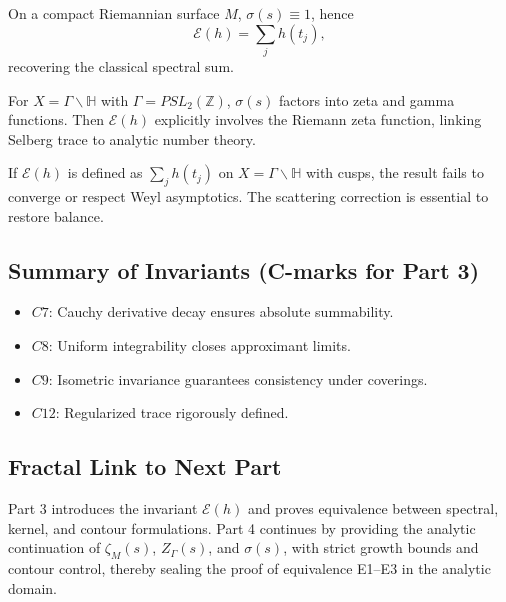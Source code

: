 \begin{example}
On a compact Riemannian surface $M$, $\sigma(s)\equiv 1$, hence
\[
\mathcal{E}(h) = \sum_j h(t_j),
\]
recovering the classical spectral sum.
\end{example}

\begin{example}
For $X=\Gamma\backslash\mathbb{H}$ with $\Gamma=PSL_2(\mathbb{Z})$, $\sigma(s)$ factors into zeta and gamma functions. Then $\mathcal{E}(h)$ explicitly involves the Riemann zeta function, linking Selberg trace to analytic number theory.
\end{example}

\begin{counterexample}
If $\mathcal{E}(h)$ is defined as $\sum_j h(t_j)$ on $X=\Gamma\backslash\mathbb{H}$ with cusps, the result fails to converge or respect Weyl asymptotics. The scattering correction is essential to restore balance.
\end{counterexample}

\subsection*{Summary of Invariants (C-marks for Part 3)}

\begin{itemize}
  \item $C7$: Cauchy derivative decay ensures absolute summability.
  \item $C8$: Uniform integrability closes approximant limits.
  \item $C9$: Isometric invariance guarantees consistency under coverings.
  \item $C12$: Regularized trace rigorously defined.
\end{itemize}

\subsection*{Fractal Link to Next Part}

Part 3 introduces the invariant $\mathcal{E}(h)$ and proves equivalence between spectral, kernel, and contour formulations.  
Part 4 continues by providing the analytic continuation of $\zeta_M(s)$, $Z_\Gamma(s)$, and $\sigma(s)$, with strict growth bounds and contour control, thereby sealing the proof of equivalence E1–E3 in the analytic domain.


